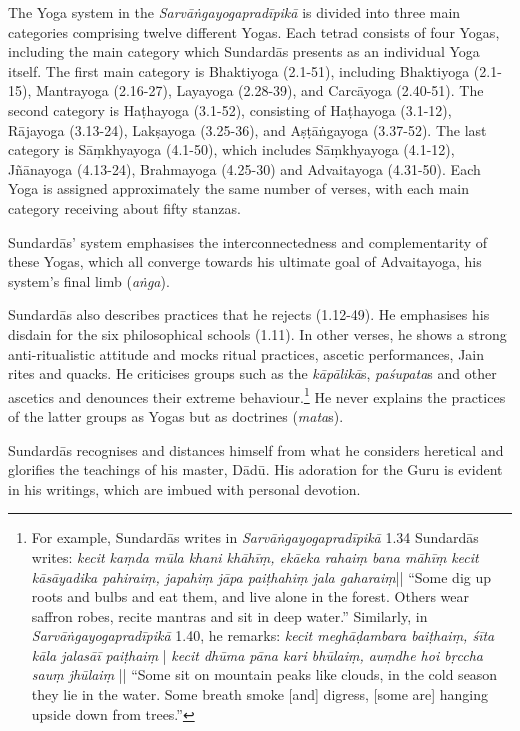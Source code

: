 The Yoga system in the \emph{Sarvāṅgayogapradīpikā} is divided into three main categories comprising twelve different Yogas. Each tetrad consists of four Yogas, including the main category which Sundardās presents as an individual Yoga itself.  The first main category is Bhaktiyoga (2.1-51), including Bhaktiyoga (2.1-15), Mantrayoga (2.16-27), Layayoga (2.28-39), and Carcāyoga (2.40-51). The second category is Haṭhayoga (3.1-52), consisting of Haṭhayoga (3.1-12), Rājayoga (3.13-24), Lakṣayoga (3.25-36), and Aṣṭāṅgayoga (3.37-52). The last category is Sāṃkhyayoga (4.1-50), which includes Sāṃkhyayoga (4.1-12), Jñānayoga (4.13-24), Brahmayoga (4.25-30) and Advaitayoga (4.31-50). Each Yoga is assigned approximately the same number of verses, with each main category receiving about fifty stanzas.

Sundardās' system emphasises the interconnectedness and complementarity of these Yogas, which all converge towards his ultimate goal of Advaitayoga, his system's final limb (\textit{aṅga}).  

Sundardās also describes practices that he rejects (1.12-49). He emphasises his disdain for the six philosophical schools (1.11). In other verses, he shows a strong anti-ritualistic attitude and mocks ritual practices, ascetic performances, Jain rites and quacks. He criticises groups such as the \textit{kāpālikā}s, \textit{paśupata}s and other ascetics and denounces their extreme behaviour.\footnote{For example, Sundardās writes in \emph{Sarvāṅgayogapradīpikā} 1.34 Sundardās writes: 
\textit{kecit kaṃda mūla khani khāhīṃ, ekāeka rahaiṃ bana māhīṃ} \textit{kecit kāsāyadika pahiraiṃ, japahiṃ jāpa paiṭhahiṃ jala gaharaiṃ}|| ``Some dig up roots and bulbs and eat them, and live alone in the forest. Others wear saffron robes, recite mantras and sit in deep water.'' Similarly, in \emph{Sarvāṅgayogapradīpikā} 1.40, he remarks: \textit{kecit meghāḍambara baiṭhaiṃ, śīta kāla jalasāī paiṭhaiṃ} | \textit{kecit dhūma pāna kari bhūlaiṃ, auṃdhe hoi bṛccha sauṃ jhūlaiṃ} || ``Some sit on mountain peaks like clouds, in the cold season they lie in the water. Some breath smoke [and] digress, [some are] hanging upside down from trees.''} He never explains the practices of the latter groups as Yogas but as doctrines (\textit{mata}s).

Sundardās recognises and distances himself from what he considers heretical and glorifies the teachings of his master, Dādū. His adoration for the Guru is evident in his writings, which are imbued with personal devotion.

